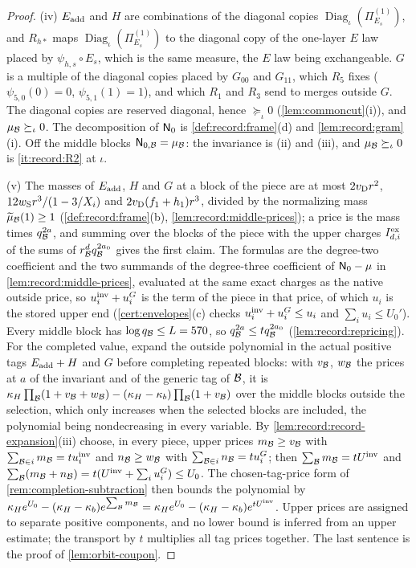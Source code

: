 \begin{proof}
(iv) $E_{\rm add}$ and $H$ are combinations of the diagonal copies
$\operatorname{Diag}_\iota(\Pi^{(1)}_{E_s})$, and $R_{h*}$ maps
$\operatorname{Diag}_\iota(\Pi^{(1)}_{E_s})$ to the diagonal copy of the one-layer $E$
law placed by $\psi_{h,s}\circ E_s$, which is the same measure, the $E$ law being
exchangeable. $G$ is a multiple of the diagonal copies placed by $G_{00}$ and
$G_{11}$, which $R_5$ fixes ($\psi_{5,0}(0)=0$, $\psi_{5,1}(1)=1$), and which
$R_1$ and $R_3$ send to merges outside $G$. The diagonal copies are reserved
diagonal, hence $\succeq_\iota0$ (\cref{lem:commoncut}(i)), and $\mu_\mathcal B\succeq_\iota0$.
The decomposition of $\mathsf N_0$ is \cref{def:record:frame}(d) and \cref{lem:record:gram}(i).
Off the middle blocks $\mathsf N_{0,\mathcal B}=\mu_\mathcal B$: the
invariance is (ii) and (iii), and $\mu_\mathcal B\succeq_\iota0$ is \ref{it:record:R2} at
$\iota$.

(v) The masses of $E_{\rm add}$, $H$ and $G$ at a block of the piece are at most
$2v_{\rm D}r^2$, $12w_{\rm S}r^3/(1-3/X_i)$ and $2v_{\rm D}(f_1+h_1)r^3$, divided by the
normalizing mass $\widetilde\mu_\mathcal B(1)\ge1$ (\cref{def:record:frame}(b),
\cref{lem:record:middle-prices}); a price is the mass times $q_\mathcal B^{2a}$, and summing
over the blocks of the piece with the upper charges $I^{\rm ex}_{d,i}$ of the sums of
$r_\mathcal B^dq_\mathcal B^{2a_0}$ gives the first claim. The formulas are the degree-two
coefficient and the two summands of the degree-three coefficient of $\mathsf N_0-\mu$ in
\cref{lem:record:middle-prices}, evaluated at the same exact charges as the native
outside price, so $u^{\rm inv}_i+u^G_i$ is the term of the piece in that price, of
which $u_i$ is the stored upper end (\cref{cert:envelopes}(c) checks
$u^{\rm inv}_i+u^G_i\le u_i$ and $\sum_iu_i\le U_0'$). Every middle block has
$\log q_\mathcal B\le L=570$, so $q_\mathcal B^{2a}\le tq_\mathcal B^{2a_0}$ (\cref{lem:record:repricing}).
For the completed value, expand the outside polynomial in the actual positive tags $E_{\rm add}+H$ and $G$ before completing repeated blocks: with $v_\mathcal B$, $w_\mathcal B$ the prices at $a$ of
the invariant and of the generic tag of $\mathcal B$, it is
$\kappa_H\prod_\mathcal B(1+v_\mathcal B+w_\mathcal B)-(\kappa_H-\kappa_b)\prod_\mathcal B(1+v_\mathcal B)$ over the middle
blocks outside the selection, which only increases when the selected blocks are
included, the polynomial being nondecreasing in every variable. By
\cref{lem:record:record-expansion}(iii) choose, in every piece, upper prices
$m_\mathcal B\ge v_\mathcal B$ with $\sum_{\mathcal B\in i}m_\mathcal B=tu^{\rm inv}_i$ and $n_\mathcal B\ge w_\mathcal B$ with
$\sum_{\mathcal B\in i}n_\mathcal B=tu^G_i$; then $\sum_\mathcal B m_\mathcal B=tU^{\mathrm{inv}}$ and
$\sum_\mathcal B(m_\mathcal B+n_\mathcal B)=t(U^{\mathrm{inv}}+\sum_iu^G_i)\le U_0$. The chosen-tag-price form of
\cref{rem:completion-subtraction} then bounds the polynomial by
$\kappa_He^{U_0}-(\kappa_H-\kappa_b)e^{\sum_\mathcal B m_\mathcal B}=\kappa_He^{U_0}-(\kappa_H-\kappa_b)e^{tU^{\mathrm{inv}}}$.
Upper prices are assigned to separate positive components, and no lower bound is
inferred from an upper estimate; the transport by $t$ multiplies all tag prices
together. The last sentence is the proof of \cref{lem:orbit-coupon}.
\end{proof}

